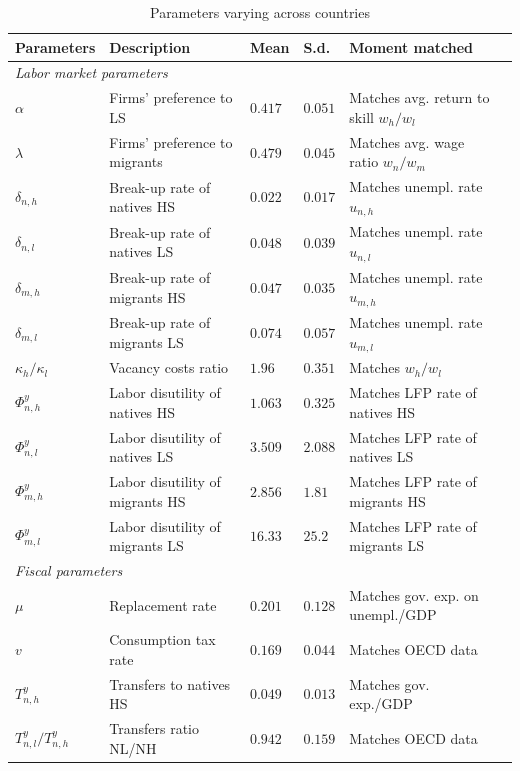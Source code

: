 \documentclass[a4paper,12pt]{article}
\begin{document}
\begin{table}[htb!]
\centering
\par
\caption{Parameters varying across countries} \label{tab:parameters_country_specific}
\footnotesize
\begin{tabular}{llllll}
\hline\hline
Parameters & Description & Mean & S.d. & Moment matched \\ \hline
\multicolumn{5}{l}{\textit{Labor market parameters}} \\ \hline
$\alpha$ & Firms' preference to LS & $0.417$ & $0.051$ & Matches avg. return to skill $w_h/w_l$\\
$\lambda$ & Firms' preference to migrants & $0.479$ & $0.045$ & Matches avg. wage ratio $w_n/w_m$\\
$\delta_{n,h}$ & Break-up rate of natives HS & $0.022$ & $0.017$ & Matches unempl. rate $u_{n,h}$\\
$\delta_{n,l}$ & Break-up rate of natives LS & $0.048$ & $0.039$ & Matches unempl. rate $u_{n,l}$\\
$\delta_{m,h}$ & Break-up rate of migrants HS & $0.047$ & $0.035$ & Matches unempl. rate $u_{m,h}$\\
$\delta_{m,l}$ & Break-up rate of migrants LS & $0.074$ & $0.057$ & Matches unempl. rate $u_{m,l}$\\
$\kappa_h/\kappa_l$ & Vacancy costs ratio & $1.96$ & $0.351$ & Matches  $w_h/w_l$\\
$\Phi^y_{n,h}$ & Labor disutility of natives HS & $1.063$ & $0.325$ & Matches  LFP rate of natives HS\\
$\Phi^y_{n,l}$ & Labor disutility of natives LS & $3.509$ & $2.088$ & Matches  LFP rate of natives LS\\
$\Phi^y_{m,h}$ & Labor disutility of migrants HS & $2.856$ & $1.81$ & Matches  LFP rate of migrants HS\\
$\Phi^y_{m,l}$ & Labor disutility of migrants LS & $16.33$ & $25.2$ & Matches  LFP rate of migrants LS\\
\hline
\multicolumn{5}{l}{\textit{Fiscal parameters}} \\ \hline
$\mu$ & Replacement rate & $0.201$ & $0.128$ & Matches gov. exp. on unempl./GDP\\
$v$ & Consumption tax rate & $0.169$ & $0.044$ & Matches OECD data\\
$T^y_{n,h}$ & Transfers to natives HS & $0.049$ & $0.013$& Matches gov. exp./GDP \\
$T^y_{n,l}/T^y_{n,h}$ & Transfers ratio NL/NH & $0.942$ &$0.159$ & Matches OECD data\\

\end{tabular}
\end{table}
\end{document}

